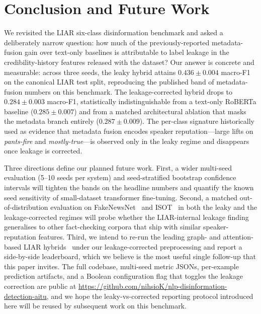 \documentclass[journal]{IEEEtran}
\begin{document}
\section{Conclusion and Future Work}
\label{sec:conclusion}
We revisited the LIAR six-class disinformation benchmark and asked a deliberately narrow question: how much of the previously-reported metadata-fusion gain over text-only baselines is attributable to label leakage in the credibility-history features released with the dataset? Our answer is concrete and measurable: across three seeds, the leaky hybrid attains $0.436 \pm 0.004$ macro-F1 on the canonical LIAR test split, reproducing the published band of metadata-fusion numbers on this benchmark. The leakage-corrected hybrid drops to $0.284 \pm 0.003$ macro-F1, statistically indistinguishable from a text-only RoBERTa baseline ($0.285 \pm 0.007$) and from a matched architectural ablation that masks the metadata branch entirely ($0.287 \pm 0.009$). The per-class signature historically used as evidence that metadata fusion encodes speaker reputation---large lifts on \emph{pants-fire} and \emph{mostly-true}---is observed only in the leaky regime and disappears once leakage is corrected.

Three directions define our planned future work. First, a wider multi-seed evaluation (5--10 seeds per system) and seed-stratified bootstrap confidence intervals will tighten the bands on the headline numbers and quantify the known seed sensitivity of small-dataset transformer fine-tuning. Second, a matched out-of-distribution evaluation on FakeNewsNet~\cite{shu2017} and ISOT~\cite{sadeghi2022} in both the leaky and the leakage-corrected regimes will probe whether the LIAR-internal leakage finding generalises to other fact-checking corpora that ship with similar speaker-reputation features. Third, we intend to re-run the leading graph- and attention-based LIAR hybrids~\cite{zhang2024heterosgt,gu2024,tong2025,zhang2024phd} under our leakage-corrected preprocessing and report a side-by-side leaderboard, which we believe is the most useful single follow-up that this paper invites. The full codebase, multi-seed metric JSONs, per-example prediction artifacts, and a Boolean configuration flag that toggles the leakage correction are public at \url{https://github.com/nihsioK/nlp-disinformation-detection-aitu}, and we hope the leaky-vs-corrected reporting protocol introduced here will be reused by subsequent work on this benchmark.
\end{document}
